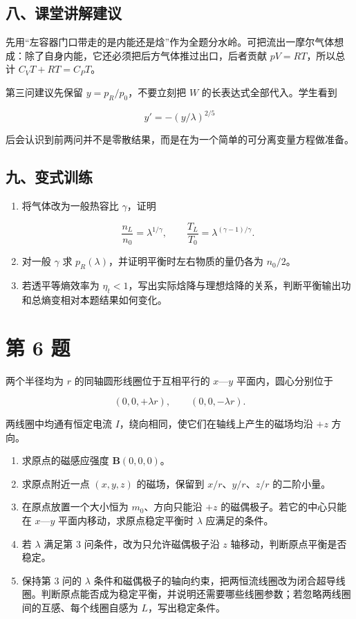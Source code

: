 \documentclass[12pt,a4paper,UTF8]{ctexart}
\newcommand{\tightlist}{\setlength{\itemsep}{0pt}\setlength{\parskip}{0pt}}
\begin{document}
\subsection{八、课堂讲解建议}\label{ux516bux8bfeux5802ux8bb2ux89e3ux5efaux8bae-4}

先用``左容器门口带走的是内能还是焓''作为全题分水岭。可把流出一摩尔气体想成：除了自身内能，它还必须把后方气体推过出口，后者贡献
\(pV=RT\)，所以总计 \(C_VT+RT=C_PT\)。

第三问建议先保留 \(y=p_R/p_0\)，不要立刻把 \(W\)
的长表达式全部代入。学生看到

\[y'=-(y/\lambda)^{2/5}\]

后会认识到前两问并不是零散结果，而是在为一个简单的可分离变量方程做准备。

\subsection{九、变式训练}\label{ux4e5dux53d8ux5f0fux8badux7ec3-4}

\begin{enumerate}
\def\labelenumi{\arabic{enumi}.}
\item
  将气体改为一般热容比 \(\gamma\)，证明

  \[
  \frac{n_L}{n_0}=\lambda^{1/\gamma},
  \qquad
  \frac{T_L}{T_0}=\lambda^{(\gamma-1)/\gamma}.
  \]
\item
  对一般 \(\gamma\) 求 \(p_R(\lambda)\)，并证明平衡时左右物质的量仍各为
  \(n_0/2\)。
\item
  若透平等熵效率为
  \(\eta_t<1\)，写出实际焓降与理想焓降的关系，判断平衡输出功和总熵变相对本题结果如何变化。
\end{enumerate}

\newpage

\section{第 6 题}\label{ux7b2c-6-ux9898}

两个半径均为 \(r\) 的同轴圆形线圈位于互相平行的 \(x\)---\(y\)
平面内，圆心分别位于

\[
(0,0,+\lambda r),
\qquad
(0,0,-\lambda r).
\]

两线圈中均通有恒定电流 \(I\)，绕向相同，使它们在轴线上产生的磁场均沿
\(+z\) 方向。

\begin{enumerate}
\def\labelenumi{\arabic{enumi}.}
\tightlist
\item
  求原点的磁感应强度 \(\bm B(0,0,0)\)。
\item
  求原点附近一点 \((x,y,z)\) 的磁场，保留到 \(x/r\)、\(y/r\)、\(z/r\)
  的二阶小量。
\item
  在原点放置一个大小恒为 \(m_0\)、方向只能沿 \(+z\)
  的磁偶极子。若它的中心只能在 \(x\)---\(y\)
  平面内移动，求原点稳定平衡时 \(\lambda\) 应满足的条件。
\item
  若 \(\lambda\) 满足第 3 问条件，改为只允许磁偶极子沿 \(z\)
  轴移动，判断原点平衡是否稳定。
\item
  保持第 3 问的 \(\lambda\)
  条件和磁偶极子的轴向约束，把两恒流线圈改为闭合超导线圈。判断原点能否成为稳定平衡，并说明还需要哪些线圈参数；若忽略两线圈间的互感、每个线圈自感为
  \(L\)，写出稳定条件。
\end{enumerate}
\end{document}
